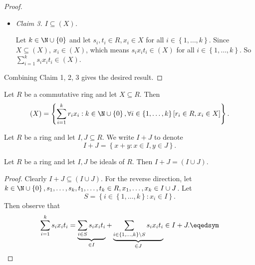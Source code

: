 \documentclass[pmath347]{subfiles}
\begin{document}
\begin{proof}
\begin{itemize}
            \item \textit{Claim 3. $I\subseteq \left( X \right)$.}

                \begin{subproof}
                    Let $k\in\N\cup\left\lbrace 0 \right\rbrace$ and let $s_i,t_i\in R, x_i\in X$ for all $i\in\left\lbrace 1,\ldots,k \right\rbrace$. Since $X\subseteq \left( X \right)$, $x_i\in \left( X \right)$, which means $s_ix_it_i\in \left( X \right)$ for all $i\in\left\lbrace 1,\ldots,k \right\rbrace$. So $\sum^{k}_{i=1} s_ix_it_i\in \left( X \right)$.
                \end{subproof}
        \end{itemize} 
        Combining Claim 1, 2, 3 gives the desired result.
    \end{proof}

    \begin{cor}{}
        Let $R$ be a commutative ring and let $X\subseteq R$. Then
        \begin{equation*}
            \left( X \right) = \left\lbrace \sum^{k}_{i=1} r_ix_i: k\in\N\cup\left\lbrace 0 \right\rbrace , \forall i\in\left\lbrace 1,\ldots,k \right\rbrace \left[ r_i\in R, x_i\in X \right]  \right\rbrace .
        \end{equation*}
    \end{cor}	

    \np Let $R$ be a ring and let $I,J\subseteq R$. We write $I+J$ to denote
    \begin{equation*}
        I+J = \left\lbrace x+y:x\in I, y\in J \right\rbrace .
    \end{equation*}

    \clearpage
    \begin{cor}{}
        Let $R$ be a ring and let $I,J$ be ideals of $R$. Then $I+J = \left( I\cup J \right)$.
    \end{cor}	
    
    \begin{proof}
        Clearly $I+J\subseteq\left( I\cup J \right)$. For the reverse direction, let $k\in\N\cup\left\lbrace 0 \right\rbrace, s_1,\ldots,s_k,t_1,\ldots,t_k\in R, x_1,\ldots,x_k\in I\cup J$. Let
        \begin{equation*}
            S = \left\lbrace i\in\left\lbrace 1,\ldots,k \right\rbrace : x_i\in I \right\rbrace .
        \end{equation*}
        Then observe that
        \begin{equation*}
            \sum^{k}_{i=1} s_ix_it_i = \underbrace{\sum^{}_{i\in S}s_ix_it_i}_{\in I} + \underbrace{\sum^{}_{i\in \left\lbrace 1,\ldots,k \right\rbrace \setminus S} s_ix_it_i}_{\in J} \in I+J. \eqedsym
        \end{equation*}
    \end{proof}
    
\end{document}
